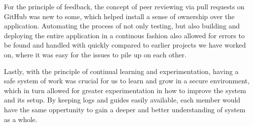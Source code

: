 For the principle of feedback, the concept of peer reviewing via pull requests on GitHub was new to some, which helped install a sense of ownership over the application. Automating the process of not only testing, but also building and deploying the entire application in a continous fashion also allowed for errors to be found and handled with quickly compared to earlier projects we have worked on, where it was easy for the issues to pile up on each other.

Lastly, with the principle of continual learning and experimentation, having a safe system of work\cite{devopshandbook} was crucial for us to learn and grow in a secure environment, which in turn allowed for greater experimentation in how to improve the system and its setup. By keeping logs and guides easily available, each member would have the same oppertunity to gain a deeper and better understanding of system as a whole.
